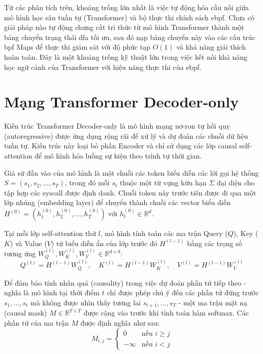 \documentclass[../main.tex]{subfiles}
\begin{document}
Từ các phân tích trên, khoảng trống lớn nhất là việc tự động hóa cầu
nối giữa mô hình học sâu tuần tự (Transformer) và bộ thực thi chính
sách \gls{ebpf}. Chưa có giải pháp nào tự động chưng cất tri thức từ mô
hình Transformer thành một bảng chuyển trạng thái \gls{dfa} tối ưu, sau đó
nạp bảng chuyển này vào các cấu trúc \gls{bpf} Maps để thực thi giám sát
với độ phức tạp $O(1)$ và khả năng giải thích hoàn toàn. Đây là một
khoảng trống kỹ thuật lớn trong việc kết nối khả năng học ngữ cảnh
của Transformer với hiệu năng thực thi của \gls{ebpf}.

\section{Mạng Transformer Decoder-only}
\label{sec:transformer}

Kiến trúc Transformer Decoder-only \cite{vaswani2017attention} là mô hình mạng nơ-ron tự hồi quy
(autoregressive) được ứng dụng rộng rãi để xử lý và dự đoán các chuỗi
dữ liệu tuần tự. Kiến trúc này loại bỏ phần Encoder và chỉ sử dụng
các lớp causal self-attention để mô hình hóa luồng sự kiện theo trình
tự thời gian.

Giả sử đầu vào của mô hình là một chuỗi các token biểu diễn các lời
gọi hệ thống $S = (s_1, s_2, \ldots, s_T)$, trong đó mỗi $s_t$ thuộc
một từ vựng hữu hạn $\Sigma$ đại diện cho tập hợp các \gls{syscall} được
định danh. Chuỗi token này trước tiên được đi qua một lớp nhúng
(embedding layer) để chuyển thành chuỗi các vector biểu diễn $H^{(0)}
= (h_1^{(0)}, h_2^{(0)}, \ldots, h_T^{(0)})$ với $h_t^{(0)} \in \mathbb{R}^d$.

Tại mỗi lớp self-attention thứ $l$, mô hình tính toán các ma trận
Query ($Q$), Key ($K$) và Value ($V$) từ biểu diễn ẩn của lớp trước
đó $H^{(l-1)}$ bằng các trọng số tương ứng $W_Q^{(l)}, W_K^{(l)},
W_V^{(l)} \in \mathbb{R}^{d \times d}$:
\begin{equation}
  Q^{(l)} = H^{(l-1)} W_Q^{(l)}, \quad K^{(l)} = H^{(l-1)} W_K^{(l)},
  \quad V^{(l)} = H^{(l-1)} W_V^{(l)}
\end{equation}

Để đảm bảo tính nhân quả (causality) trong việc dự đoán phần tử tiếp
theo - nghĩa là mô hình tại thời điểm $t$ chỉ được phép chú ý đến các
phần tử đứng trước $s_1, \ldots, s_t$ mà không được nhìn thấy tương
lai $s_{t+1}, \ldots, s_T$ - một ma trận mặt nạ (causal mask) $M \in
\mathbb{R}^{T \times T}$ được cộng vào trước khi tính toán hàm
softmax. Các phần tử của ma trận $M$ được định nghĩa như sau:
\begin{equation}
  M_{i,j} =
  \begin{cases}
    0 & \text{nếu } i \ge j \\
    -\infty & \text{nếu } i < j
  \end{cases}
\end{equation}
\end{document}
